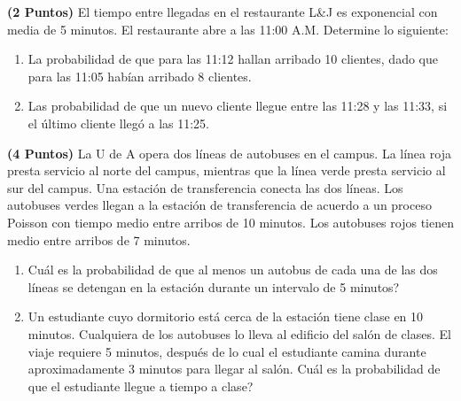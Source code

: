 \documentclass[ a4paper, twoside, 11pt]{article}
\begin{document}
\begin{problem}
\textbf{(2 Puntos)} El tiempo entre llegadas en el restaurante L\&J es exponencial con media de 5 minutos. El restaurante abre a las 11:00 A.M. Determine lo siguiente: 
\begin{enumerate}[label=\alph*)]
\item La probabilidad de que para las 11:12 hallan arribado 10 clientes, dado que para las 11:05 hab\'ian arribado 8 clientes. 
\item Las probabilidad de que un nuevo cliente llegue entre las 11:28 y las 11:33, si el \'ultimo cliente lleg\'o a las 11:25. 
\end{enumerate}

\end{problem}
\vspace{\baselineskip}

\begin{problem}
\textbf{(4 Puntos)} La U de A opera dos l\'ineas de autobuses en el campus. \linebreak La l\'inea roja presta servicio al norte del campus, mientras que la l\'inea verde presta servicio \linebreak al sur del campus. Una estaci\'on de transferencia conecta las dos l\'ineas. Los autobuses verdes llegan a la estaci\'on de transferencia de acuerdo a un proceso Poisson con tiempo medio entre arribos de 10 minutos. Los autobuses rojos tienen medio entre arribos de 7 minutos. 
\begin{enumerate}[label=\alph*)]
\item Cu\'al es la probabilidad de que al menos un autobus de cada una de las dos l\'ineas se detengan en la estaci\'on durante un intervalo de 5 minutos?
\item Un estudiante cuyo dormitorio est\'a cerca de la estaci\'on tiene clase en 10 minutos. Cualquiera de los autobuses lo lleva al edificio del sal\'on de clases. El viaje requiere 5 minutos, despu\'es de lo cual el estudiante camina durante aproximadamente 3 minutos para llegar al sal\'on. Cu\'al es la probabilidad de que el estudiante llegue a tiempo a clase?
\end{enumerate}

\end{problem}
\vspace{\baselineskip}

\begin{problem}


\end{problem}
\vspace{\baselineskip}

\begin{problem}

\end{problem}
\vspace{\baselineskip}
\end{document}
